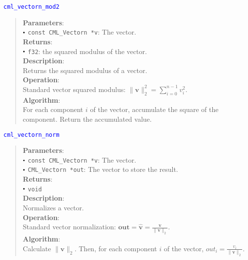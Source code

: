 \documentclass[a4paper,oneside,8pt]{extarticle}
\newcommand{\function}[1]{
  \noindent\textcolor{blue}{\texttt{#1}}
  \vspace{-0.3em}
}
\renewcommand{\dot}{\raisebox{0.3ex}{\scalebox{0.6}{$\bullet$}}}
\theoremstyle{definition}
\begin{document}
\function{cml\_vectorn\_mod2}
\begin{quote}
  \textbf{Parameters}: \\
  $\dot$ \texttt{const CML\_Vectorn *v}: The vector. \\
  \textbf{Returns}: \\
  $\dot$ \texttt{f32}: the squared modulus of the vector. \\

  \vspace{-0.75em}
  \textbf{Description}: \\
  Returns the squared modulus of a vector. \\

  \vspace{-0.75em}
  \textbf{Operation}: \\
  Standard vector squared modulus: $\lVert\mathbf{v}\rVert_2^2 = \sum_{i=0}^{n-1} v_i^2$. \\

  \vspace{-0.75em}
  \textbf{Algorithm}: \\
  For each component $i$ of the vector, accumulate the square of the component. Return the accumulated value. \\
\end{quote}

\function{cml\_vectorn\_norm}
\begin{quote}
  \textbf{Parameters}: \\
  $\dot$ \texttt{const CML\_Vectorn *v}: The vector. \\
  $\dot$ \texttt{CML\_Vectorn *out}: The vector to store the result. \\
  \textbf{Returns}: \\
  $\dot$ \texttt{void} \\

  \vspace{-0.75em}
  \textbf{Description}: \\
  Normalizes a vector. \\

  \vspace{-0.75em}
  \textbf{Operation}: \\
  Standard vector normalization: $\mathbf{out} = \hat{\mathbf{v}} = \frac{\mathbf{v}}{\lVert\mathbf{v}\rVert_2}$. \\

  \vspace{-0.75em}
  \textbf{Algorithm}: \\
  Calculate $\lVert\mathbf{v}\rVert_2$. Then, for each component $i$ of the vector, $out_i = \frac{v_i}{\lVert\mathbf{v}\rVert_2}$. \\
\end{quote}
\end{document}
